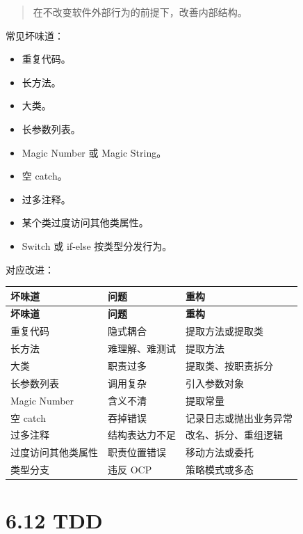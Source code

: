 \documentclass[UTF8,zihao=-4]{ctexart}
\begin{document}
\begin{quote}
在不改变软件外部行为的前提下，改善内部结构。
\end{quote}

常见坏味道：

\begin{itemize}
\item 重复代码。
\item 长方法。
\item 大类。
\item 长参数列表。
\item Magic Number 或 Magic String。
\item 空 catch。
\item 过多注释。
\item 某个类过度访问其他类属性。
\item Switch 或 if-else 按类型分发行为。
\end{itemize}

对应改进：

{
\footnotesize
\begin{longtable}{|>{\raggedright\arraybackslash}p{}|>{\raggedright\arraybackslash}p{}|>{\raggedright\arraybackslash}p{}|}
\hline
\textbf{坏味道} & \textbf{问题} & \textbf{重构} \\
\hline
\endfirsthead
\hline
\textbf{坏味道} & \textbf{问题} & \textbf{重构} \\
\hline
\endhead
重复代码 & 隐式耦合 & 提取方法或提取类 \\
\hline
长方法 & 难理解、难测试 & 提取方法 \\
\hline
大类 & 职责过多 & 提取类、按职责拆分 \\
\hline
长参数列表 & 调用复杂 & 引入参数对象 \\
\hline
Magic Number & 含义不清 & 提取常量 \\
\hline
空 catch & 吞掉错误 & 记录日志或抛出业务异常 \\
\hline
过多注释 & 结构表达力不足 & 改名、拆分、重组逻辑 \\
\hline
过度访问其他类属性 & 职责位置错误 & 移动方法或委托 \\
\hline
类型分支 & 违反 OCP & 策略模式或多态 \\
\hline
\end{longtable}
}


\section{6.12 TDD}
\end{document}
